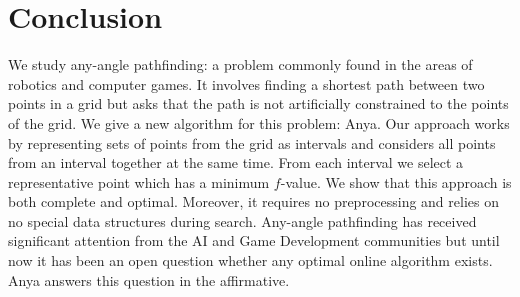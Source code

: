 \section{Conclusion}
We study any-angle pathfinding: a problem commonly found in the areas of
robotics and computer games. It involves finding a shortest path between two
points in a grid but asks that the path is not artificially constrained to the
points of the grid.  We give a new algorithm for this problem: Anya.  Our
approach works by representing sets of points from the grid as intervals and
considers all points from an interval together at the same time. From each
interval we select a representative point which has a minimum $f$-value. We show
that this approach is both complete and optimal. Moreover, it requires no
preprocessing and relies on no special data structures during search.  Any-angle
pathfinding has received significant attention from the AI and Game Development
communities but until now it has been an open question whether any optimal
online algorithm exists. Anya answers this question in the affirmative.
